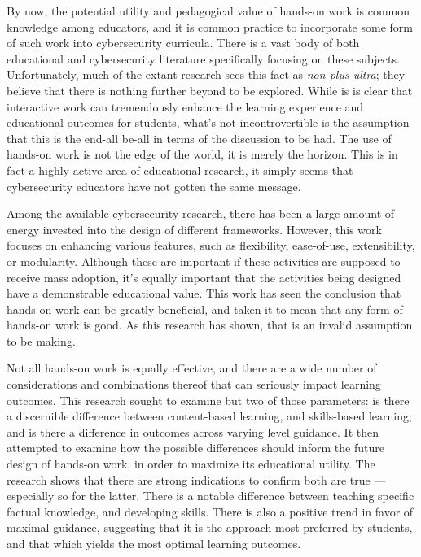 
By now, the potential utility and pedagogical value of hands-on work is common knowledge among educators, and it is common practice to incorporate some form of such work into cybersecurity curricula. 
There is a vast body of both educational and cybersecurity literature specifically focusing on these subjects. 
Unfortunately, much of the extant research sees this fact as \emph{non plus ultra}; 
they believe that there is nothing further beyond to be explored. 
While is is clear that interactive work can tremendously enhance the learning experience and educational outcomes for students, what's not incontrovertible is the assumption that this is the end-all be-all in terms of the discussion to be had. 
The use of hands-on work is not the edge of the world, it is merely the horizon. 
This is in fact a highly active area of educational research, it simply seems that cybersecurity educators have not gotten the same message. 

Among the available cybersecurity research, there has been a large amount of energy invested into the design of different frameworks. 
However, this work focuses on enhancing various features, such as flexibility, ease-of-use, extensibility, or modularity. 
Although these are important if these activities are supposed to receive mass adoption, it's equally important that the activities being designed have a demonstrable educational value. 
This work has seen the conclusion that hands-on work can be greatly beneficial, and taken it to mean that any form of hands-on work is good. 
As this research has shown, that is an invalid assumption to be making. 

Not all hands-on work is equally effective, and there are a wide number of considerations and combinations thereof that can seriously impact learning outcomes. 
This research sought to examine but two of those parameters: 
is there a discernible difference between content-based learning, and skills-based learning; 
and is there a difference in outcomes across varying level guidance. 
It then attempted to examine how the possible differences should inform the future design of hands-on work, in order to maximize its educational utility. 
The research shows that there are strong indications to confirm both are true --- 
especially so for the latter. 
There is a notable difference between teaching specific factual knowledge, and developing skills. 
There is also a positive trend in favor of maximal guidance, suggesting that it is the approach most preferred by students, and that which yields the most optimal learning outcomes. 

